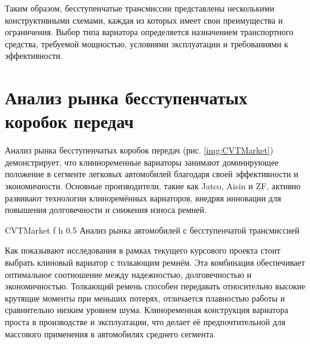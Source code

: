 Таким образом, бесступенчатые трансмиссии представлены несколькими конструктивными схемами, каждая из которых имеет свои преимущества и ограничения. Выбор типа вариатора определяется назначением транспортного средства, требуемой мощностью, условиями эксплуатации и требованиями к эффективности.

\section{Анализ рынка бесступенчатых коробок передач}

Анализ рынка бесступенчатых коробок передач (рис. \ref{img:CVTMarket}) демонстрирует, что клинноременные вариаторы занимают доминирующее положение в сегменте легковых автомобилей благодаря своей эффективности и экономичности. Основные производители, такие как Jatco, Aisin и ZF, активно развивают технологии клиноремённых вариаторов, внедряя инновации для повышения долговечности и снижения износа ремней.

    {CVTMarket} %
    {f} %
    {h} %
    {0.5\textwidth} %
    {Анализ рынка автомобилей с бесступенчатой трансмиссией \cite{CVTMarketLib}} %

Как показывают исследования в рамках текущего курсового проекта стоит выбрать клиновый вариатор с толкающим ремнём. Эта комбинация обеспечивает оптимальное соотношение между надежностью, долговечностью и экономичностью. Толкающий ремень способен передавать относительно высокие крутящие моменты при меньших потерях, отличается плавностью работы и сравнительно низким уровнем шума. Клиноременная конструкция вариатора проста в производстве и эксплуатации, что делает её предпочтительной для массового применения в автомобилях среднего сегмента.
